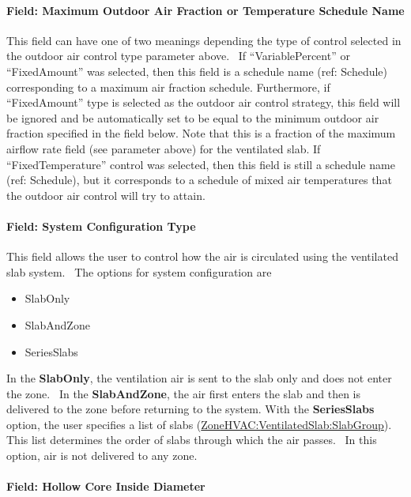 \paragraph{Field: Maximum Outdoor Air Fraction or Temperature Schedule Name}\label{field-maximum-outdoor-air-fraction-or-temperature-schedule-name}

This field can have one of two meanings depending the type of control selected in the outdoor air control type parameter above.~ If ``VariablePercent'' or ``FixedAmount'' was selected, then this field is a schedule name (ref: Schedule) corresponding to a maximum air fraction schedule. Furthermore, if ``FixedAmount'' type is selected as the outdoor air control strategy, this field will be ignored and be automatically set to be equal to the minimum outdoor air fraction specified in the field below. Note that this is a fraction of the maximum airflow rate field (see parameter above) for the ventilated slab. If ``FixedTemperature'' control was selected, then this field is still a schedule name (ref: Schedule), but it corresponds to a schedule of mixed air temperatures that the outdoor air control will try to attain.

\paragraph{Field: System Configuration Type}\label{field-system-configuration-type}

This field allows the user to control how the air is circulated using the ventilated slab system.~ The options for system configuration are

\begin{itemize}
\item
  SlabOnly
\item
  SlabAndZone
\item
  SeriesSlabs
\end{itemize}

In the \textbf{SlabOnly}, the ventilation air is sent to the slab only and does not enter the zone.~ In the \textbf{SlabAndZone}, the air first enters the slab and then is delivered to the zone before returning to the system. With the \textbf{SeriesSlabs} option, the user specifies a list of slabs (\hyperref[zonehvacventilatedslabslabgroup]{ZoneHVAC:VentilatedSlab:SlabGroup}). This list determines the order of slabs through which the air passes.~ In this option, air is not delivered to any zone.

\paragraph{Field: Hollow Core Inside Diameter}\label{field-hollow-core-inside-diameter}

